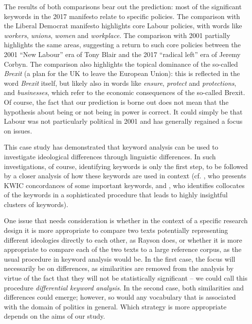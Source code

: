 The results of both comparisons bear out the prediction: most of the significant keywords  in the 2017 manifesto relate to specific policies. The comparison with the Liberal Democrat manifesto highlights core Labour policies, with words like \textit{workers}, \textit{unions}, \textit{women} and \textit{workplace}. The comparison with 2001 partially highlights the same areas, suggesting a return to such core policies between the 2001 ``New Labour'' era of Tony Blair and the 2017 ``radical left'' era of Jeremy Corbyn. The comparison also highlights the topical dominance of the so\hyp{}called \textit{Brexit} (a plan for the UK to leave the European Union): this is reflected in the word \textit{Brexit} itself, but likely also in words like \textit{ensure}, \textit{protect} and \textit{protections}, and \textit{businesses}, which refer to the economic consequences of the so\hyp{}called Brexit. Of course, the fact that our prediction is borne out does not mean that the hypothesis about being or not being in power is correct. It could simply be that Labour was not particularly political in 2001 and has generally regained a focus on issues.

This case study has demonstrated that keyword  analysis can be used to investigate ideological  differences through linguistic differences. In such investigations, of course, identifying keywords is only the first step, to be followed by a closer analysis of how these keywords are used in context (cf. \citealt{rayson_key_2008}, who presents KWIC  concordances  of some important keywords,  and \citealt{scott_pc_1997}, who identifies collocates  of the keywords in a sophisticated procedure that leads to highly insightful clusters of keywords).

One issue that needs consideration is whether in the context of a specific research design  it is more appropriate to compare two texts potentially representing different ideologies  directly to each other, as Rayson does, or whether it is more appropriate to compare each of the two texts to a large  reference corpus, as the usual procedure in keyword  analysis would be. In the first case, the focus will necessarily be on differences, as similarities are removed from the analysis by virtue of the fact that they will not be statistically significant -- we could call this procedure \textit{differential keyword analysis}. In the second case, both similarities and differences could emerge; however, so would any vocabulary that is associated  with the domain of politics in general. Which strategy is more appropriate depends on the aims of our study.

